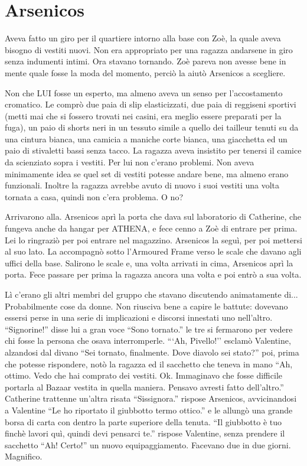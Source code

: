  \section*{Arsenicos}

    Aveva fatto un giro per il quartiere intorno alla base con Zoè, la quale aveva bisogno di vestiti nuovi. Non era
    appropriato per una ragazza andarsene in giro senza indumenti intimi. Ora stavano tornando. Zoè pareva non avesse
    bene in mente quale fosse la moda del momento, perciò la aiutò Arsenicos a scegliere.

    Non che LUI fosse un esperto, ma almeno aveva un senso per l'accostamento cromatico. Le comprò due paia di slip
    elasticizzati, due paia di reggiseni sportivi (metti mai che si fossero trovati nei casini, era meglio essere
    preparati per la fuga), un paio di shorts neri in un tessuto simile a quello dei tailleur tenuti su da una cintura
    bianca, una camicia a maniche corte bianca, una giacchetta ed un paio di
    stivaletti bassi senza tacco. La ragazza aveva insistito per tenersi il camice da scienziato sopra i vestiti. Per
    lui non c'erano problemi. Non aveva minimamente idea se quel set di vestiti potesse andare bene, ma almeno erano
    funzionali. Inoltre la ragazza avrebbe avuto di nuovo i suoi vestiti una volta tornata a casa, quindi non c'era
    problema. O no?

    Arrivarono alla. Arsenicos aprì la porta che dava sul laboratorio di Catherine, che fungeva anche da hangar per
    ATHENA, e fece cenno a Zoè di entrare per prima. Lei lo ringraziò per poi entrare nel magazzino. Arsenicos la seguì,
    per poi mettersi al suo lato. La accompagnò sotto l'Armoured Frame verso le scale che davano agli uffici della base.
    Salirono le scale e, una volta arrivati in cima, Arsenicos aprì la porta. Fece passare per prima la ragazza ancora
    una volta e poi entrò a sua volta.

    Lì c'erano gli altri membri del gruppo che stavano discutendo animatamente di... Probabilmente cose da donne. Non
    riusciva bene a capire le battute: dovevano essersi perse in una serie di implicazioni e discorsi innestati uno
    nell'altro. ``Signorine!'' disse lui a gran voce ``Sono tornato.'' le tre si fermarono per vedere chi fosse la
    persona che osava interromperle. ```Ah, Pivello!'' esclamò Valentine, alzandosi dal divano ``Sei tornato,
    finalmente. Dove diavolo sei stato?'' poi, prima che potesse rispondere, notò la ragazza ed il sacchetto che teneva
    in mano ``Ah, ottimo. Vedo che hai comprato dei vestiti. Ok. Immaginavo che fosse difficile portarla al Bazaar
    vestita in quella maniera. Pensavo avresti fatto dell'altro.'' Catherine trattenne un'altra risata ``Sissignora.''
    rispose Arsenicos, avvicinandosi a Valentine ``Le ho riportato il giubbotto termo ottico.'' e le allungò una grande
    borsa di carta con dentro la parte superiore della tenuta. ``Il giubbotto è tuo finchè lavori quì, quindi devi
    pensarci te.'' rispose Valentine, senza prendere il sacchetto ``Ah! Certo!'' un nuovo equipaggiamento. Facevano due
    in due giorni. Magnifico.

